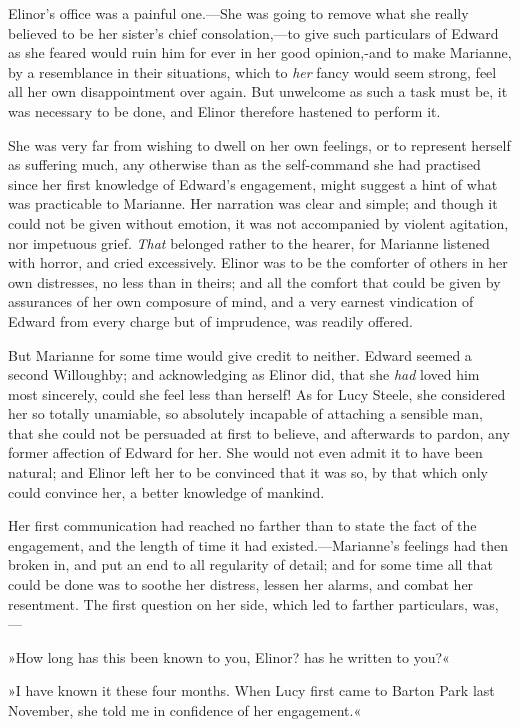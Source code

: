 Elinor’s office was a painful one.—She was going to remove what she really believed to be her sister’s chief consolation,—to give such particulars of Edward as she feared would ruin him for ever in her good opinion,-and to make Marianne, by a resemblance in their situations, which to \textit{her} fancy would seem strong, feel all her own disappointment over again. But unwelcome as such a task must be, it was necessary to be done, and Elinor therefore hastened to perform it.

She was very far from wishing to dwell on her own feelings, or to represent herself as suffering much, any otherwise than as the self-command she had practised since her first knowledge of Edward’s engagement, might suggest a hint of what was practicable to Marianne. Her narration was clear and simple; and though it could not be given without emotion, it was not accompanied by violent agitation, nor impetuous grief. \textit{That} belonged rather to the hearer, for Marianne listened with horror, and cried excessively. Elinor was to be the comforter of others in her own distresses, no less than in theirs; and all the comfort that could be given by assurances of her own composure of mind, and a very earnest vindication of Edward from every charge but of imprudence, was readily offered.

But Marianne for some time would give credit to neither. Edward seemed a second Willoughby; and acknowledging as Elinor did, that she \textit{had} loved him most sincerely, could she feel less than herself! As for Lucy Steele, she considered her so totally unamiable, so absolutely incapable of attaching a sensible man, that she could not be persuaded at first to believe, and afterwards to pardon, any former affection of Edward for her. She would not even admit it to have been natural; and Elinor left her to be convinced that it was so, by that which only could convince her, a better knowledge of mankind.

Her first communication had reached no farther than to state the fact of the engagement, and the length of time it had existed.—Marianne’s feelings had then broken in, and put an end to all regularity of detail; and for some time all that could be done was to soothe her distress, lessen her alarms, and combat her resentment. The first question on her side, which led to farther particulars, was,—

»How long has this been known to you, Elinor? has he written to you?«

»I have known it these four months. When Lucy first came to Barton Park last November, she told me in confidence of her engagement.«

